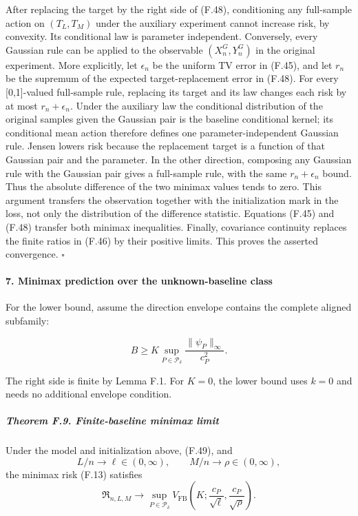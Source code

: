 After replacing the target by the right side of (F.48), conditioning any
full-sample action on \((T_L,T_M)\) under the auxiliary experiment
cannot increase risk, by convexity. Its conditional law is parameter
independent. Conversely, every Gaussian rule can be applied to the
observable \((X_n^G,Y_n^G)\) in the original experiment. More
explicitly, let \(\epsilon_n\) be the uniform TV error in (F.45), and
let \(r_n\) be the supremum of the expected target-replacement error in
(F.48). For every {[}0,1{]}-valued full-sample rule, replacing its
target and its law changes each risk by at most \(r_n+\epsilon_n\).
Under the auxiliary law the conditional distribution of the original
samples given the Gaussian pair is the baseline conditional kernel; its
conditional mean action therefore defines one parameter-independent
Gaussian rule. Jensen lowers risk because the replacement target is a
function of that Gaussian pair and the parameter. In the other
direction, composing any Gaussian rule with the Gaussian pair gives a
full-sample rule, with the same \(r_n+\epsilon_n\) bound. Thus the
absolute difference of the two minimax values tends to zero. This
argument transfers the observation together with the initialization mark
in the loss, not only the distribution of the difference statistic.
Equations (F.45) and (F.48) transfer both minimax inequalities. Finally,
covariance continuity replaces the finite ratios in (F.46) by their
positive limits. This proves the asserted convergence. \(\square\)

\paragraph{7. Minimax prediction over the unknown-baseline
class}\label{minimax-prediction-over-the-unknown-baseline-class}

For the lower bound, assume the direction envelope contains the complete
aligned subfamily:

\[
B\ge K\sup_{P\in\mathcal P_\delta}
\frac{\|\psi_P\|_\infty}{c_P^2}.
\tag{F.49}
\]

The right side is finite by Lemma F.1. For \(K=0\), the lower bound uses
\(k=0\) and needs no additional envelope condition.

\subparagraph{Theorem F.9. Finite-baseline minimax
limit}\label{theorem-f.9.-finite-baseline-minimax-limit}

Under the model and initialization above, (F.49), and \[
L/n\to\ell\in(0,\infty),\qquad M/n\to\rho\in(0,\infty),
\] the minimax risk (F.13) satisfies \[
\boxed{
\mathfrak R_{n,L,M}\longrightarrow
\sup_{P\in\mathcal P_\delta}
V_{\mathrm{FB}}\!\left(
K;\frac{c_P}{\sqrt\ell},\frac{c_P}{\sqrt\rho}
\right).
}
\tag{F.50}
\]

